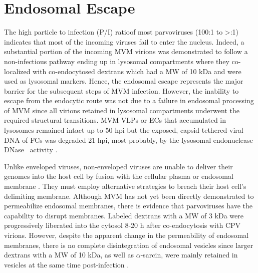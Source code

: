 
\section{Endosomal Escape}
\label{Escape}
The high particle to infection (P/I) ratio\footnotemark of most parvoviruses (100:1 to >:1) \cite{pmid4673484, pmid20649475, pmid7288919} indicates that most of the incoming viruses fail to enter the nucleus. Indeed, a substantial portion of the incoming MVM virions was demonstrated to follow a non-infectious pathway ending up in lysosomal compartments where they co-localized with co-endocytosed dextrans which had a MW of 10 kDa and were used as lysosomal markers. Hence, the endosomal escape represents the major barrier for the subsequent steps of MVM infection. However, the inability to escape from the endocytic route was not due to a failure in endosomal processing of MVM since all virions retained in lysosomal compartments underwent the required structural transitions. MVM VLPs or ECs that accumulated in lysosomes remained intact up to 50 hpi but the exposed, capsid-tethered viral DNA of FCs was degraded 21 hpi, most probably, by the lysosomal endonuclease DNase~ activity \cite{pmid16379002}. 

Unlike enveloped viruses, non-enveloped viruses are unable to deliver their genomes into the host cell by fusion with the cellular plasma or endosomal membrane \cite{pmid18596815}. They must employ alternative strategies to breach their host cell's delimiting membrane. Although MVM has not yet been directly demonstrated to permeabilize endosomal membranes, there is evidence that parvoviruses have the capability to disrupt membranes. Labeled dextrans with a MW of 3 kDa were progressively liberated into the cytosol 8-20 h after co-endocytosis with CPV virions. However, despite the apparent change in the permeability of endosomal membranes, there is no complete disintegration of endosomal vesicles since larger dextrans with a MW of 10 kDa, as well as $\alpha$-sarcin, were mainly retained in vesicles at the same time post-infection \cite{pmid14644609, pmid10644365}.

